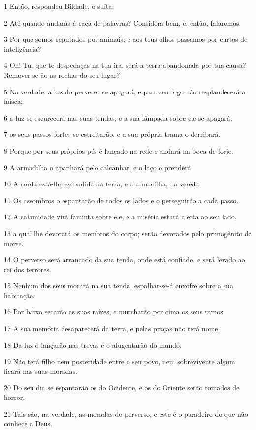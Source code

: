 \par 1 Então, respondeu Bildade, o suíta:
\par 2 Até quando andarás à caça de palavras? Considera bem, e, então, falaremos.
\par 3 Por que somos reputados por animais, e aos teus olhos passamos por curtos de inteligência?
\par 4 Oh! Tu, que te despedaças na tua ira, será a terra abandonada por tua causa? Remover-se-ão as rochas do seu lugar?
\par 5 Na verdade, a luz do perverso se apagará, e para seu fogo não resplandecerá a faísca;
\par 6 a luz se escurecerá nas suas tendas, e a sua lâmpada sobre ele se apagará;
\par 7 os seus passos fortes se estreitarão, e a sua própria trama o derribará.
\par 8 Porque por seus próprios pés é lançado na rede e andará na boca de forje.
\par 9 A armadilha o apanhará pelo calcanhar, e o laço o prenderá.
\par 10 A corda está-lhe escondida na terra, e a armadilha, na vereda.
\par 11 Os assombros o espantarão de todos os lados e o perseguirão a cada passo.
\par 12 A calamidade virá faminta sobre ele, e a miséria estará alerta ao seu lado,
\par 13 a qual lhe devorará os membros do corpo; serão devorados pelo primogênito da morte.
\par 14 O perverso será arrancado da sua tenda, onde está confiado, e será levado ao rei dos terrores.
\par 15 Nenhum dos seus morará na sua tenda, espalhar-se-á enxofre sobre a sua habitação.
\par 16 Por baixo secarão as suas raízes, e murcharão por cima os seus ramos.
\par 17 A sua memória desaparecerá da terra, e pelas praças não terá nome.
\par 18 Da luz o lançarão nas trevas e o afugentarão do mundo.
\par 19 Não terá filho nem posteridade entre o seu povo, nem sobrevivente algum ficará nas suas moradas.
\par 20 Do seu dia se espantarão os do Ocidente, e os do Oriente serão tomados de horror.
\par 21 Tais são, na verdade, as moradas do perverso, e este é o paradeiro do que não conhece a Deus.

